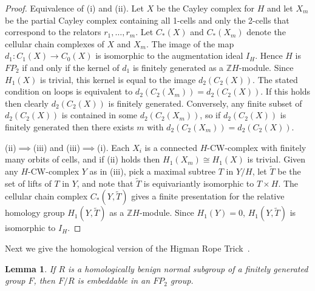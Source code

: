 \documentclass[12pt,a4paper]{article}
\newtheorem{lemma}[theorem]{Lemma}
\newcommand{\zz}{{\mathbb Z}}
\begin{document}
\begin{proof} 
Equivalence of (i) and (ii).  Let $X$ be the Cayley complex for $H$
and let $X_m$ be the partial Cayley complex containing all 1-cells and 
only the 2-cells that correspond to the relators $r_1,\ldots,r_m$. 
Let $C_*(X)$ and $C_*(X_m)$ denote the cellular chain complexes of 
$X$ and $X_m$.  The image of the map
$d_1:C_1(X)\rightarrow C_0(X)$ is isomorphic to the augmentation 
ideal $I_H$.  Hence $H$ is
$FP_2$ if and only if the kernel of $d_1$ is finitely generated as a
$\zz H$-module.  Since $H_1(X)$ is trivial, this kernel is equal to
the image $d_2(C_2(X))$.  The stated condition on loops is equivalent
to $d_2(C_2(X_m))=d_2(C_2(X))$.  If this holds then clearly
$d_2(C_2(X))$ is finitely generated.  Conversely, any finite subset of
$d_2(C_2(X))$ is contained in some $d_2(C_2(X_m))$, so if
$d_2(C_2(X))$ is finitely generated then there exists $m$ with
$d_2(C_2(X_m))=d_2(C_2(X))$.

(ii)$\implies$(iii) and (iii)$\implies$(i).  Each $X_i$ is a connected
$H$-CW-complex with finitely many orbits of cells, and if (ii) holds
then $H_1(X_m)\cong H_1(X)$ is trivial.  Given any $H$-CW-complex $Y$
as in (iii), pick a maximal subtree $T$ in $Y/H$, let $\widetilde T$
be the set of lifts of $T$ in $Y$, and note that $\widetilde T$ is
equivariantly isomorphic to $T\times H$.  The cellular chain complex
$C_*(Y,\widetilde T)$ gives a finite presentation for the relative
homology group $H_1(Y,\widetilde T)$ as a $\zz H$-module.  Since
$H_1(Y)=0$, $H_1(Y,\widetilde T)$ is isomorphic to $I_H$.
\end{proof} 

Next we give the homological version of the Higman Rope 
Trick~\cite[IV.7.6]{lynsch}.  

\begin{lemma} \label{lem:higrope}
If $R$ is a homologically benign normal subgroup of a finitely
generated group $F$, then $F/R$ is embeddable in an $FP_2$ group.  
\end{lemma} 
\end{document}
